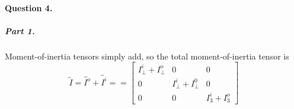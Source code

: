 


\paragraph{Question 4.}

\subparagraph{Part 1.}  Moment-of-inertia tensors simply add, so the
total moment-of-inertia tensor is $$\overleftrightarrow{I}
= \overleftrightarrow{I^o} + \overleftrightarrow{I^i} =
= \begin{bmatrix}
I_\bot^i + I_\bot^o & 0 & 0 \\
0 & I_\bot^i + I_\bot^0 & 0 \\
0 & 0 & I_3^i + I_3^o
\end{bmatrix}$$


